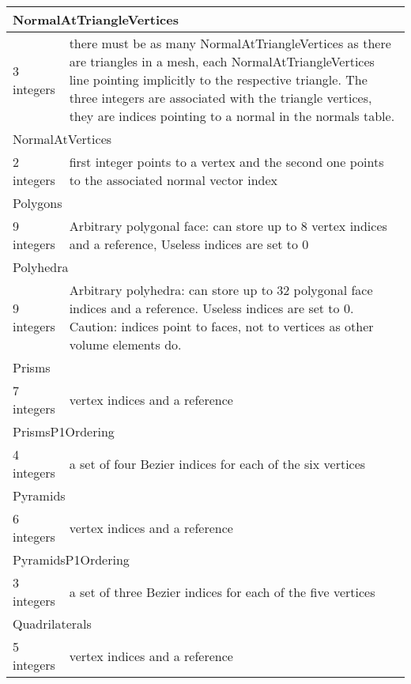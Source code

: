 \documentclass[a4paper,12pt]{article}
\begin{document}
\begin{longtable}{|m{4cm}|m{11cm}|}
\multicolumn{2}{|l|}{NormalAtTriangleVertices} \\
\hline
3 integers & there must be as many NormalAtTriangleVertices as there are triangles in a mesh, each NormalAtTriangleVertices line pointing implicitly to the respective triangle. The three integers are associated with the triangle vertices, they are indices pointing to a normal in the normals table. \\
\hline\hline

\multicolumn{2}{|l|}{NormalAtVertices} \\
\hline
2 integers & first integer points to a vertex and the second one points to the associated normal vector index \\
\hline\hline

\multicolumn{2}{|l|}{Polygons} \\
\hline
9 integers & Arbitrary polygonal face: can store up to 8 vertex indices and a reference, Useless indices are set to 0 \\
\hline\hline

\multicolumn{2}{|l|}{Polyhedra} \\
\hline
9 integers & Arbitrary polyhedra: can store up to 32 polygonal face indices and a reference. Useless indices are set to 0. Caution: indices point to faces, not to vertices as other volume elements do. \\
\hline\hline

\multicolumn{2}{|l|}{Prisms} \\
\hline
7 integers & vertex indices and a reference \\
\hline\hline

\multicolumn{2}{|l|}{PrismsP1Ordering} \\
\hline
4 integers & a set of four Bezier indices for each of the six vertices \\
\hline\hline

\multicolumn{2}{|l|}{Pyramids} \\
\hline
6 integers & vertex indices and a reference \\
\hline\hline

\multicolumn{2}{|l|}{PyramidsP1Ordering} \\
\hline
3 integers & a set of three Bezier indices for each of the five vertices \\
\hline\hline

\multicolumn{2}{|l|}{Quadrilaterals} \\
\hline
5 integers & vertex indices and a reference \\
\hline\hline


\end{longtable}
\end{document}
